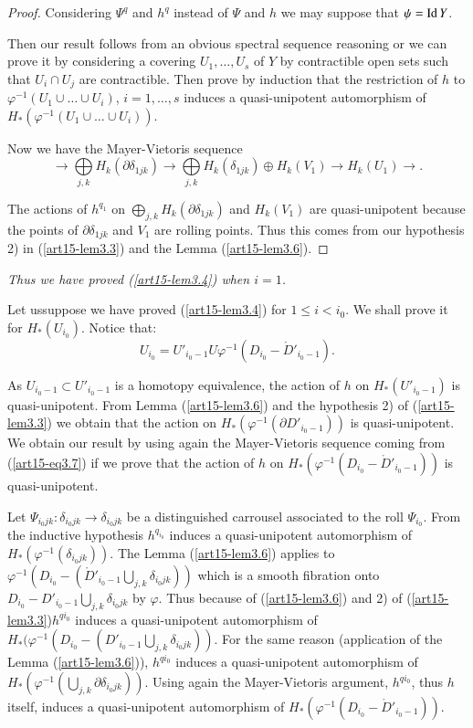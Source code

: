 \begin{proof}
Considering $\Psi^q$ and $h^q$ instead of $\Psi$ and $h$ we may suppose that $\psi=\operatorname{Id} Y$.

Then our result follows from an obvious spectral sequence reasoning or we can prove it by considering a covering $U_1, \ldots, U_s$ of $Y$ by contractible open sets such that $U_i \cap U_j$ are contractible. Then prove by induction that the restriction of $h$ to $\varphi^{-1} (U_1 \cup \ldots \cup U_i)$, $i = 1, \ldots, s$ induces a quasi-unipotent automorphism of $H_* (\varphi^{-1} (U_1 \cup \ldots \cup U_i))$.

Now we have the Mayer-Vietoris sequence
$$
\to \bigoplus\limits_{j,k} H_k (\partial \delta_{1jk}) \to \bigoplus\limits_{j,k} H_k (\delta_{1jk}) \oplus H_k(V_1) \to H_k (U_1) \to .
$$

The actions of $h^{q_1}$ on $\bigoplus\limits_{j,k} H_k (\partial \delta_{1jk})$ and $H_k(V_1)$ are quasi-unipotent because the points of $\partial \delta_{1jk}$ and $V_1$ are rolling points. Thus this comes from our hypothesis 2) in (\ref{art15-lem3.3}) and the Lemma (\ref{art15-lem3.6}).
\end{proof}

{\em Thus we have proved (\ref{art15-lem3.4}) when $i=1$.}

Let us\pageoriginale suppose we have proved (\ref{art15-lem3.4}) for $1 \leqslant i < i_0$. We shall prove it for $H_* (U_{i_0})$. Notice that:
\begin{equation*}
U_{i_0} = U'_{i_0-1} U \varphi^{-1} (D_{i_0} - \mathring{D}'_{i_0-1}). 
\tag{3.7}\label{art15-eq3.7}
\end{equation*}

As $U_{i_0-1} \subset U'_{i_0-1}$ is a homotopy equivalence, the action of $h$ on $H_* (U'_{i_0-1})$ is quasi-unipotent. From Lemma (\ref{art15-lem3.6}) and the hypothesis 2) of (\ref{art15-lem3.3}) we obtain that the action on $H_* (\varphi^{-1} (\partial D'_{i_0-1}))$ is quasi-unipotent. We obtain our result by using again the Mayer-Vietoris sequence coming from (\ref{art15-eq3.7}) if we prove that the action of $h$ on $H_* (\varphi^{-1} (D_{i_0} - \mathring{D}'_{i_0-1}))$ is quasi-unipotent.

Let $\Psi_{i_0jk}: \delta_{i_0 jk} \to \delta_{i_0jk}$ be a distinguished carrousel associated to the roll $\Psi_{i_0}$. From the inductive hypothesis $h^{q_{i_0}}$ induces a quasi-unipotent automorphism of $H_* (\varphi^{-1} (\delta_{i_0 jk}))$. The Lemma (\ref{art15-lem3.6}) applies to $\varphi^{-1} (D_{i_0} - (\mathring{D}'_{i_0-1} \bigcup\limits_{j,k} \delta_{i_0 jk}))$ which is a smooth fibration onto $D_{i_0} - D'_{i_0-1} \bigcup\limits_{j,k} \delta_{i_0 jk} $ by $\varphi$. Thus because of (\ref{art15-lem3.6}) and 2) of (\ref{art15-lem3.3})$h^{qi_0}$ induces a quasi-unipotent automorphism of $H_* (\varphi^{-1} (D_{i_0} - (D'_{i_0 -1} \bigcup\limits_{j,k} \delta_{i_0jk}))$. For the same reason (application of the Lemma (\ref{art15-lem3.6})), $h^{qi_0}$ induces a quasi-unipotent automorphism of $H_* (\varphi^{-1} (\bigcup\limits_{j,k} \partial \delta_{i_0 jk}))$. Using again the Mayer-Vietoris argument, $h^{qi_0}$, thus $h$ itself, induces a quasi-unipotent automorphism of $H_* (\varphi^{-1} (D_{i_0} - \mathring{D}'_{i_0-1}))$.

